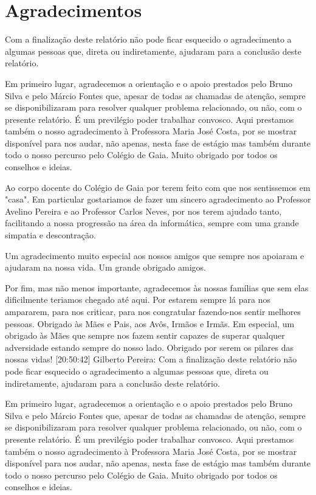\documentclass[11pt]{report}
\begin{document}
\newpage


\chapter*{Agradecimentos}
Com a finalização deste relatório não pode ficar esquecido o agradecimento a algumas pessoas que, direta ou indiretamente, ajudaram para a conclusão deste relatório.

Em primeiro lugar, agradecemos a orientação e o apoio prestados pelo Bruno Silva e pelo Márcio Fontes que, apesar de todas as chamadas de atenção, sempre se disponibilizaram para resolver qualquer problema relacionado, ou não, com o presente relatório. É um previlégio poder trabalhar convosco.
Aqui prestamos também o nosso agradecimento à Professora Maria José Costa, por se mostrar disponível para nos audar, não apenas, nesta fase de estágio mas também durante todo o nosso percurso pelo Colégio de Gaia. Muito obrigado por todos os conselhos e ideias. 

Ao corpo docente do Colégio de Gaia por terem feito com que nos sentissemos em "casa". Em particular gostariamos de fazer um sincero agradecimento ao Professor Avelino Pereira e ao Professor Carlos Neves, por nos terem ajudado tanto, facilitando a nossa progressão na área da informática, sempre com uma grande simpatia e descontração.

Um agradecimento muito especial aos nossos amigos que sempre nos apoiaram e ajudaram na nossa vida.
Um grande obrigado amigos.

Por fim, mas não menos importante, agradecemos às nossas famílias que sem elas dificilmente teriamos chegado até aqui. Por estarem sempre lá para nos ampararem, para nos criticar, para nos congratular fazendo-nos sentir melhores pessoas. 
Obrigado às Mães e Pais, aos Avôs, Irmãos e Irmãs.
Em especial, um obrigado às Mães que sempre nos fazem sentir capazes de superar qualquer adversidade estando sempre do nosso lado.
Obrigado por serem os pilares das nossas vidas!
[20:50:42] Gilberto Pereira: Com a finalização deste relatório não pode ficar esquecido o agradecimento a algumas pessoas que, direta ou indiretamente, ajudaram para a conclusão deste relatório.

Em primeiro lugar, agradecemos a orientação e o apoio prestados pelo Bruno Silva e pelo Márcio Fontes que, apesar de todas as chamadas de atenção, sempre se disponibilizaram para resolver qualquer problema relacionado, ou não, com o presente relatório. É um previlégio poder trabalhar convosco.
Aqui prestamos também o nosso agradecimento à Professora Maria José Costa, por se mostrar disponível para nos audar, não apenas, nesta fase de estágio mas também durante todo o nosso percurso pelo Colégio de Gaia. Muito obrigado por todos os conselhos e ideias. 
\end{document}

